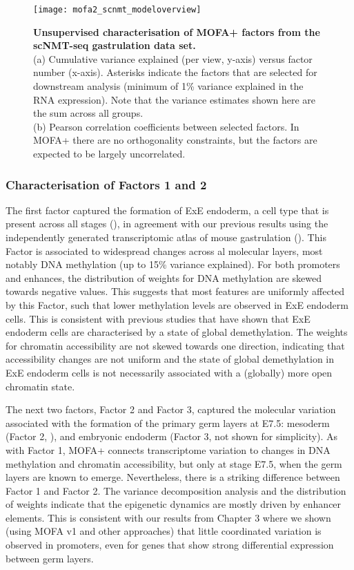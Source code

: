 \begin{figure}[H]
	\centering
	\texttt{[image: mofa2\_scnmt\_modeloverview]}
	\caption[]{
	\textbf{Unsupervised characterisation of MOFA+ factors from the scNMT-seq gastrulation data set.} \\
	(a) Cumulative variance explained (per view, y-axis) versus factor number (x-axis). Asterisks indicate the factors that are selected for downstream analysis (minimum of 1\% variance explained in the RNA expression). Note that the variance estimates shown here are the sum across all groups. \\
	(b) Pearson correlation coefficients between selected factors. In MOFA+ there are no orthogonality constraints, but the factors are expected to be largely uncorrelated.
	}
	\label{fig:mofa2_scnmt_modeloverview}
\end{figure}


\subsubsection{Characterisation of Factors 1 and 2}

The first factor captured the formation of ExE endoderm, a cell type that is present across all stages (), in agreement with our previous results using the independently generated transcriptomic atlas of mouse gastrulation (). This Factor is associated to widespread changes across al molecular layers, most notably DNA methylation (up to 15\% variance explained). For both promoters and enhances, the distribution of weights for DNA methylation are skewed towards negative values. This suggests that most features are uniformly affected by this Factor, such that lower methylation levels are observed in ExE endoderm cells. This is consistent with previous studies that have shown that ExE endoderm cells are characterised by a state of global demethylation\cite{Zhang2017,Argelaguet2019}. The weights for chromatin accessibility are not skewed towards one direction, indicating that accessibility changes are not uniform and the state of global demethylation in ExE endoderm cells is not necessarily associated with a (globally) more open chromatin state.

The next two factors, Factor 2 and Factor 3, captured the molecular variation associated with the formation of the primary germ layers at E7.5: mesoderm (Factor 2, ), and embryonic endoderm (Factor 3, not shown for simplicity). As with Factor 1, MOFA+ connects transcriptome variation to changes in DNA methylation and chromatin accessibility, but only at stage E7.5, when the germ layers are known to emerge. Nevertheless, there is a striking difference between Factor 1 and Factor 2. The variance decomposition analysis and the distribution of weights indicate that the epigenetic dynamics are mostly driven by enhancer elements. This is consistent with our results from Chapter 3 where we shown (using MOFA v1 and other approaches) that little coordinated variation is observed in promoters, even for genes that show strong differential expression between germ layers.

